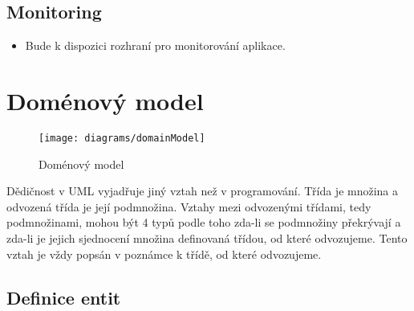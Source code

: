 \subsection{Monitoring}\label{subsec:monitoring}

\begin{itemize}
\item
  Bude k dispozici rozhraní pro monitorování aplikace.
\end{itemize}

\section{Doménový model}\label{sec:domenovy-model}

\begin{figure}[H]
    \texttt{[image: diagrams/domainModel]}
    \caption{Doménový model}\label{fig:domain-model}
\end{figure}

\begin{tcolorbox}
Dědičnost v UML vyjadřuje jiný vztah než v programování.
Třída je množina a odvozená třída je její podmnožina.
Vztahy mezi odvozenými třídami, tedy podmnožinami, mohou být 4 typů podle toho zda-li se podmnožiny překrývají a zda-li je jejich sjednocení množina definovaná třídou, od které odvozujeme.
Tento vztah je vždy popsán v poznámce k třídě, od které odvozujeme.
\end{tcolorbox}

\subsection{Definice entit}\label{subsec:definiceentit}

